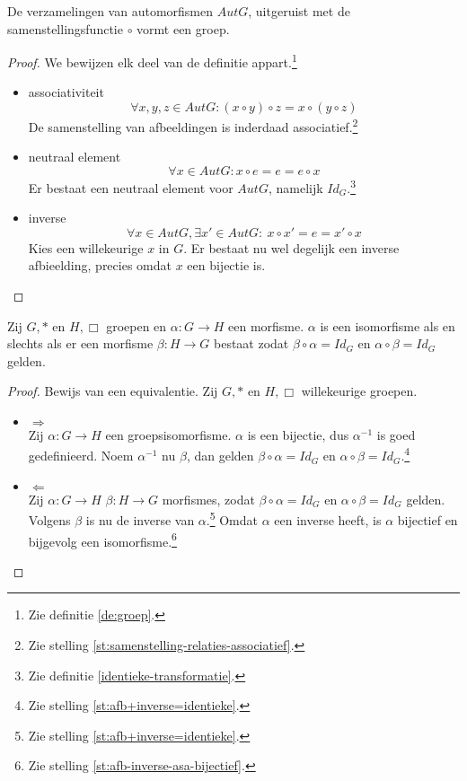 \documentclass[main.tex]{subfiles}
\begin{document}
\begin{st}
  De verzamelingen van automorfismen $Aut G$, uitgeruist met de samenstellingsfunctie $\circ$ vormt een groep.

  \begin{proof}
    We bewijzen elk deel van de definitie appart.\footnote{Zie definitie \ref{de:groep}.}
    \begin{itemize}
    \item associativiteit
      \[ \forall x, y, z \in Aut G: (x \circ y) \circ z = x \circ (y \circ z) \] 
      De samenstelling van afbeeldingen is inderdaad associatief.\footnote{Zie stelling \ref{st:samenstelling-relaties-associatief}.}
    \item neutraal element
      \[ \forall x \in Aut G: x \circ e = e = e \circ x \]
      Er bestaat een neutraal element voor $Aut G$, namelijk $Id_{G}$.\footnote{Zie definitie \ref{identieke-transformatie}.}
    \item inverse
      \[ \forall x \in Aut G, \exists x' \in Aut G:\ x \circ x' = e = x' \circ x \]
      Kies een willekeurige $x$ in $G$. Er bestaat nu wel degelijk een inverse afbieelding, precies omdat $x$ een bijectie is.
    \end{itemize}
  \end{proof}
\end{st}

\begin{st}
  Zij $G,*$ en $H,\Box$ groepen en $\alpha: G \rightarrow H$ een morfisme.
  $\alpha$ is een isomorfisme als en slechts als er een morfisme $\beta: H \rightarrow G$ bestaat zodat $\beta \circ \alpha = Id_{G}$ en $\alpha \circ \beta = Id_{G}$ gelden.

  \begin{proof}
    Bewijs van een equivalentie.
    Zij $G,*$ en $H,\Box$ willekeurige groepen. 
    \begin{itemize}
    \item $\Rightarrow$\\
      Zij $\alpha: G \rightarrow H$ een groepsisomorfisme.
      $\alpha$ is een bijectie, dus $\alpha^{-1}$ is goed gedefinieerd.
      Noem $\alpha^{-1}$ nu $\beta$, dan gelden $\beta \circ \alpha = Id_{G}$ en $\alpha \circ \beta = Id_{G}$.\footnote{Zie stelling \ref{st:afb+inverse=identieke}.}
    \item $\Leftarrow$\\
      Zij $\alpha: G \rightarrow H$ $\beta: H \rightarrow G$ morfismes, zodat $\beta \circ \alpha = Id_{G}$ en $\alpha \circ \beta = Id_{G}$ gelden.
      Volgens $\beta$ is nu de inverse van $\alpha$.\footnote{Zie stelling \ref{st:afb+inverse=identieke}.}
      Omdat $\alpha$ een inverse heeft, is $\alpha$ bijectief en bijgevolg een isomorfisme.\footnote{Zie stelling \ref{st:afb-inverse-asa-bijectief}.}
    \end{itemize}
  \end{proof}
\end{st}
\end{document}
